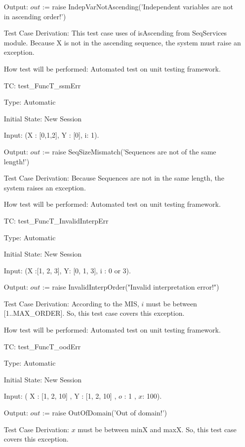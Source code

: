 \documentclass[12pt]{article}
\newcounter{utestnum} %
\begin{document}
\begin{enumerate}[label=TC\arabic*:,ref={\arabic*}]
Output: $out$ := raise IndepVarNotAscending('Independent variables are not in ascending order!')


Test Case Derivation: This test case uses of isAscending from SeqServices module. Because X is not in the ascending sequence, the system must raise an exception. 

How test will be performed: Automated test on unit testing framework.

\item [TC\refstepcounter{utestnum}\theutestnum: \label{FuncTssmErrTest}] 
test\_FuncT\_ssmErr

Type: Automatic

Initial State: New Session

Input: (X : [0,1,2], Y : [0], i: 1).

Output: $out$ := raise SeqSizeMismatch('Sequences are not of the same length!')


Test Case Derivation: Because Sequences are not in the same length, the system raises an exception. 

How test will be performed: Automated test on unit testing framework.

\item [TC\refstepcounter{utestnum}\theutestnum: \label{FuncTssmErrTest}] 
test\_FuncT\_InvalidInterpErr

Type: Automatic

Initial State: New Session

Input: (X :[1, 2, 3], Y: [0, 1, 3], i : 0 or 3).

Output: $out$ := raise InvalidInterpOrder("Invalid interpretation error!")


Test Case Derivation: According to the MIS, $i$ must be between [1..\mbox{MAX\_ORDER}]. So, this test case covers this exception.

How test will be performed: Automated test on unit testing framework.

\item [TC\refstepcounter{utestnum}\theutestnum: \label{FuncToodErrTest}] 
test\_FuncT\_oodErr

Type: Automatic

Initial State: New Session

Input: ( X : [1, 2, 10] , Y : [1, 2, 10] , $o$ : 1 , $x$: 100).

Output: $out$ :=  raise OutOfDomain('Out of domain!')


Test Case Derivation:  $x$ must be between \mbox{minX} and \mbox{maxX}. So, this test case covers this exception.


\end{enumerate}
\end{document}
